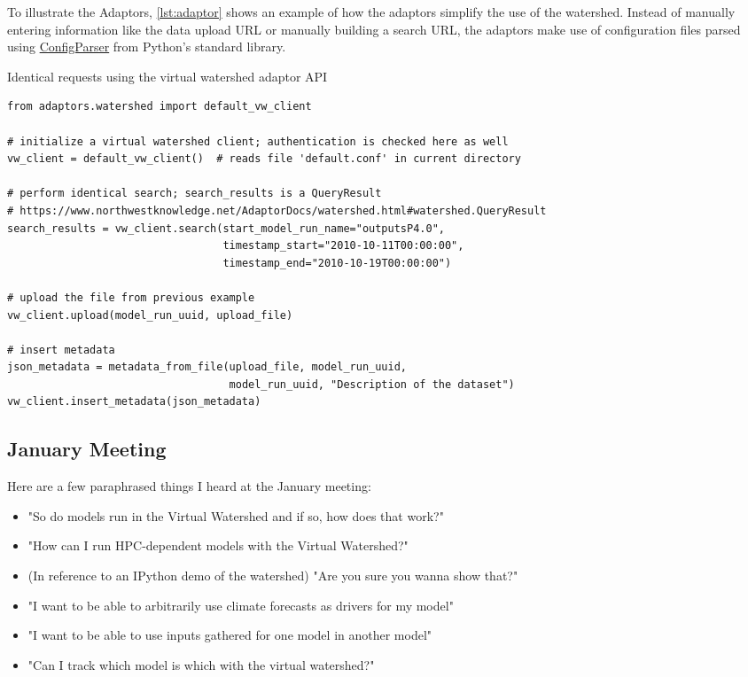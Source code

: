 \documentclass[
11pt, %
a4paper, %
oneside, %
twoside, %
headinclude,footinclude, %
BCOR5mm, %
]{scrartcl}
\begin{document}
To illustrate the Adaptors, \ref{lst:adaptor} shows an example of how 
the adaptors simplify the use of the watershed.
Instead of manually entering information like the data upload URL or manually building a 
search URL, the adaptors make use of configuration files parsed using   
\href{https://docs.python.org/2/library/configparser.html}{ConfigParser} 
from Python's standard library.

\begin{listing}
    \caption{Identical requests using the virtual watershed adaptor API}
    \begin{verbatim}
from adaptors.watershed import default_vw_client

# initialize a virtual watershed client; authentication is checked here as well
vw_client = default_vw_client()  # reads file 'default.conf' in current directory

# perform identical search; search_results is a QueryResult
# https://www.northwestknowledge.net/AdaptorDocs/watershed.html#watershed.QueryResult
search_results = vw_client.search(start_model_run_name="outputsP4.0", 
                                  timestamp_start="2010-10-11T00:00:00",
                                  timestamp_end="2010-10-19T00:00:00")

# upload the file from previous example
vw_client.upload(model_run_uuid, upload_file)

# insert metadata
json_metadata = metadata_from_file(upload_file, model_run_uuid, 
                                   model_run_uuid, "Description of the dataset")
vw_client.insert_metadata(json_metadata)
\end{verbatim}
\label{lst:adaptor}
\end{listing}


\subsection{January Meeting} %
\label{sub:January Meeting}


Here are a few paraphrased things I heard at the January meeting:

\begin{itemize}
    \item "So do models run in the Virtual Watershed and if so, how does that work?"
    \item "How can I run HPC-dependent models with the Virtual Watershed?"
    \item (In reference to an IPython demo of the watershed) "Are you sure you wanna show that?"
    \item "I want to be able to arbitrarily use climate forecasts as drivers for my model"
    \item "I want to be able to use inputs gathered for one model in another model"
    \item "Can I track which model is which with the virtual watershed?"
\end{itemize}
\end{document}
